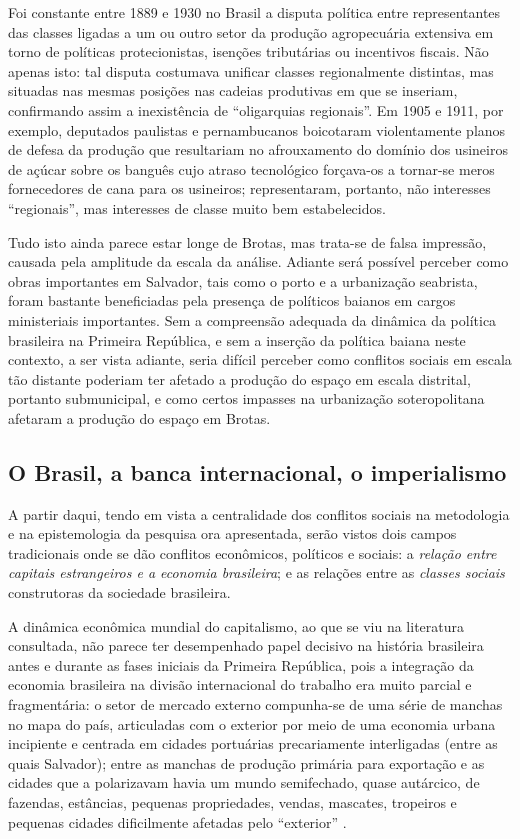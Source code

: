 Foi constante entre 1889 e 1930 no Brasil a disputa política entre representantes das classes ligadas a um ou outro setor da produção agropecuária extensiva em torno de políticas protecionistas, isenções tributárias ou incentivos fiscais. Não apenas isto: tal disputa costumava unificar classes regionalmente distintas, mas situadas nas mesmas posições nas cadeias produtivas em que se inseriam, confirmando assim a inexistência de ``oligarquias regionais''. Em 1905 e 1911, por exemplo, deputados paulistas e pernambucanos boicotaram violentamente planos de defesa da produção que resultariam no afrouxamento do domínio dos usineiros de açúcar sobre os banguês cujo atraso tecnológico forçava-os a tornar-se meros fornecedores de cana para os usineiros; representaram, portanto, não interesses ``regionais'', mas interesses de classe muito bem estabelecidos. 

Tudo isto ainda parece estar longe de Brotas, mas trata-se de falsa impressão, causada pela amplitude da escala da análise. Adiante será possível perceber como obras importantes em Salvador, tais como o porto e a urbanização seabrista, foram bastante beneficiadas pela presença de políticos baianos em cargos ministeriais importantes. Sem a compreensão adequada da dinâmica da política brasileira na Primeira República, e sem a inserção da política baiana neste contexto, a ser vista adiante, seria difícil perceber como conflitos sociais em escala tão distante poderiam ter afetado a produção do espaço em escala distrital, portanto submunicipal, e como certos impasses na urbanização soteropolitana afetaram a produção do espaço em Brotas.

\subsection{O Brasil, a banca internacional, o imperialismo}\label{subsec:brasimper}

A partir daqui, tendo em vista a centralidade dos conflitos sociais na metodologia e na epistemologia da pesquisa ora apresentada, serão vistos dois campos tradicionais onde se dão conflitos econômicos, políticos e sociais: a \textit{relação entre capitais estrangeiros e a economia brasileira}; e as relações entre as \textit{classes sociais} construtoras da sociedade brasileira.
 
A dinâmica econômica mundial do capitalismo, ao que se viu na literatura consultada, não parece ter desempenhado papel decisivo na história brasileira antes e durante as fases iniciais da Primeira República, pois a integração da economia brasileira na divisão internacional do trabalho era muito parcial e fragmentária: o setor de mercado externo compunha-se de uma série de manchas no mapa do país, articuladas com o exterior por meio de uma economia urbana incipiente e centrada em cidades portuárias precariamente interligadas (entre as quais Salvador); entre as manchas de produção primária para exportação e as cidades que a polarizavam havia um mundo semifechado, quase autárcico, de fazendas, estâncias, pequenas propriedades, vendas, mascates, tropeiros e pequenas cidades dificilmente afetadas pelo ``exterior'' \cite[p.~350]{singer_braecomu_1977}.

